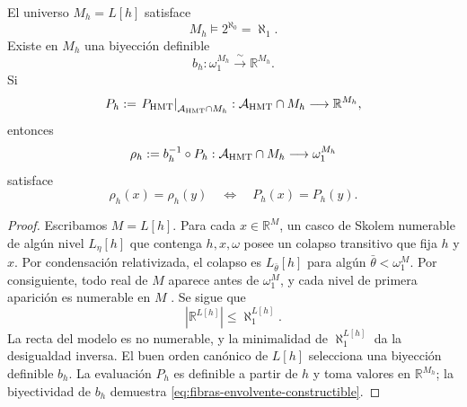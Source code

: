 \begin{theorem}
\label{thm:ch-envolvente-constructible-generador}
El universo \(M_h=L[h]\) satisface
\begin{equation}
 M_h\models2^{\aleph_0}=\aleph_1.
 \label{eq:ch-envolvente-constructible-generador}
\end{equation}
Existe en \(M_h\) una biyección definible
\begin{equation}
 b_h:\omega_1^{M_h}\xrightarrow{\;\sim\;}\mathbb R^{M_h}.
 \label{eq:biyeccion-envolvente-constructible}
\end{equation}
Si
\begin{equation}
 P_h:=\left.P_{\rm HMT}\right|_{\mathcal A_{\rm HMT}\cap M_h}:
 \mathcal A_{\rm HMT}\cap M_h\longrightarrow\mathbb R^{M_h},
 \label{eq:evaluacion-envolvente-constructible}
\end{equation}
entonces
\begin{equation}
 \rho_h:=b_h^{-1}\circ P_h:
 \mathcal A_{\rm HMT}\cap M_h\longrightarrow\omega_1^{M_h}
 \label{eq:separador-envolvente-constructible}
\end{equation}
satisface
\begin{equation}
 \rho_h(x)=\rho_h(y)
 \quad\Longleftrightarrow\quad
 P_h(x)=P_h(y).
 \label{eq:fibras-envolvente-constructible}
\end{equation}
\end{theorem}

\begin{proof}
Escribamos \(M=L[h]\). Para cada \(x\in\mathbb R^M\), un casco de Skolem
numerable de algún nivel \(L_\eta[h]\) que contenga \(h,x,\omega\) posee un
colapso transitivo que fija \(h\) y \(x\). Por condensación relativizada, el
colapso es \(L_{\bar\theta}[h]\) para algún
\(\bar\theta<\omega_1^M\). Por consiguiente, todo real de \(M\) aparece
antes de \(\omega_1^M\), y cada nivel de primera aparición es numerable en
\(M\) \cite{Jech2003}. Se sigue que
\[
 |\mathbb R^{L[h]}|\leq\aleph_1^{L[h]}.
\]
La recta del modelo es no numerable, y la minimalidad de
\(\aleph_1^{L[h]}\) da la desigualdad inversa. El buen orden canónico de
\(L[h]\) selecciona una biyección definible \(b_h\). La evaluación \(P_h\)
es definible a partir de \(h\) y toma valores en \(\mathbb R^{M_h}\); la
biyectividad de \(b_h\) demuestra
\eqref{eq:fibras-envolvente-constructible}.
\end{proof}

